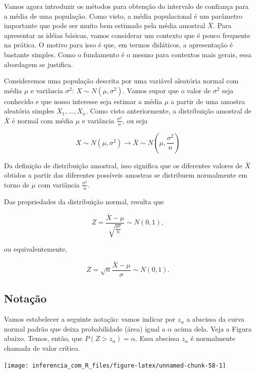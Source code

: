 \documentclass[
]{book}
\begin{document}
Vamos agora introduzir os métodos para obtenção do intervalo de confiança para a média de uma população. Como visto, a média populacional é um parâmetro importante que pode ser muito bem estimado pela média amostral \(\bar X\). Para apresentar as idéias básicas, vamos considerar um contexto que é pouco frequente na prática. O motivo para isso é que, em termos didáticos, a apresentação é bastante simples. Como o fundamento é o mesmo para contextos mais gerais, essa abordagem se justifica.

Consideremos uma população descrita por uma variável aleatória normal com média \(\mu\) e variância \(\sigma^2\): \(X\sim N(\mu,\sigma^2)\). Vamos supor que o valor de \(\sigma^2\) seja conhecido e que nosso interesse seja estimar a média \(\mu\) a partir de uma amostra aleatória simples \(X_1,\ldots,X_n\). Como visto anteriormente, a distribuição amostral de \(\bar X\) é normal com média \(\mu\) e variância \(\frac{\sigma^2}{n}\), ou seja

\[X\sim N(\mu,\sigma^2)\rightarrow \bar X \sim N\left(\mu,\frac{\sigma^2}{n}\right)\]

Da definição de distribuição amostral, isso significa que os diferentes valores de \(\bar X\) obtidos a partir das diferentes possíveis amostras se distribuem normalmente em torno de \(\mu\) com variância \(\frac{\sigma^2}{n}\).

Das propriedades da distribuição normal, resulta que

\[Z=\frac{\bar X-\mu}{\sqrt{\frac{\sigma^2}{n}}}\sim N(0,1),\]

ou equivalentemente,

\[Z=\sqrt{n}\frac{\bar X-\mu}{\sigma}\sim N(0,1).\]

\hypertarget{notauxe7uxe3o}{%
\subsection{Notação}\label{notauxe7uxe3o}}

Vamos estabelecer a seguinte notação: vamos indicar por \(z_\alpha\) a abscissa da curva normal padrão que deixa probabilidade (área) igual a \(\alpha\) acima dela. Veja a Figura abaixo. Temos, então, que \(P(Z > z_\alpha)= \alpha\). Essa abscissa \(z_\alpha\) é normalmente chamada de valor crítico.

\begin{center}\texttt{[image: inferencia\_com\_R\_files/figure-latex/unnamed-chunk-58-1]} \end{center}
\end{document}
